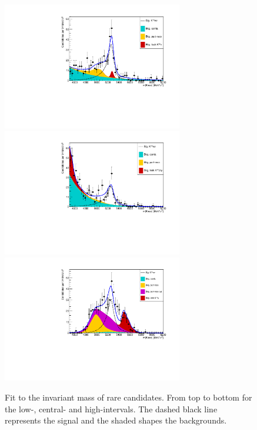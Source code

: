 \begin{figure}[h!]
\centering
\includegraphics[width=0.7\textwidth]{RKst/figs/Fit/fit_EE/fit_EEl.pdf}
\includegraphics[width=0.7\textwidth]{RKst/figs/Fit/fit_EE/fit_EEc.pdf}
\includegraphics[width=0.7\textwidth]{RKst/figs/Fit/fit_EE/fit_EEh.pdf}
\caption{Fit to the \mKpiee invariant mass of rare \BdToKstee candidates. From top to bottom for the low-, central-
and high-\qsq intervals. The dashed black line represents the signal and the shaded shapes the backgrounds.}
\label{fig:fitsEE}
\end{figure}
%
